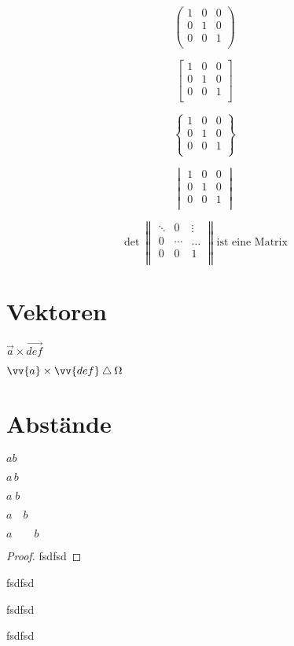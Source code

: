 \documentclass[parskip=half]{scrartcl}
\begin{document}
\[%
\begin{pmatrix} 
1 & 0 & 0 \\ 
0 & 1 & 0 \\ 
0 & 0 & 1 \\ 
\end{pmatrix}
\]

\[%
\begin{bmatrix} 
1 & 0 & 0 \\ 
0 & 1 & 0 \\ 
0 & 0 & 1 \\ 
\end{bmatrix}
\]

\[%
\begin{Bmatrix} 
1 & 0 & 0 \\ 
0 & 1 & 0 \\ 
0 & 0 & 1 \\ 
\end{Bmatrix}
\]


\[%
\begin{vmatrix} 
1 & 0 & 0 \\ 
0 & 1 & 0 \\ 
0 & 0 & 1 \\ 
\end{vmatrix}
\]

\[%
\det 
\begin{Vmatrix} 
\ddots  & 0 & \vdots \\ 
0 & \cdots & \dots \\ 
0 & 0 & 1 \\ 
\end{Vmatrix}
\text{ist eine Matrix}
\]

\section{Vektoren}

\( \vec{a} \times \vec{def} \)

\( \vv{a} \times \vv{def} \bigtriangleup \Omega  \)

\section{Abstände}

\( ab \) %

\(a\,b \)

\(a\;b\)

\(a\quad b\)

\(a\qquad b\)


\begin{proof}
fsdfsd
\end{proof}

\begin{theorem}
fsdfsd
\end{theorem}

\begin{lemma}
fsdfsd
\end{lemma}

\begin{corollary}
fsdfsd
\end{corollary}
\end{document}
